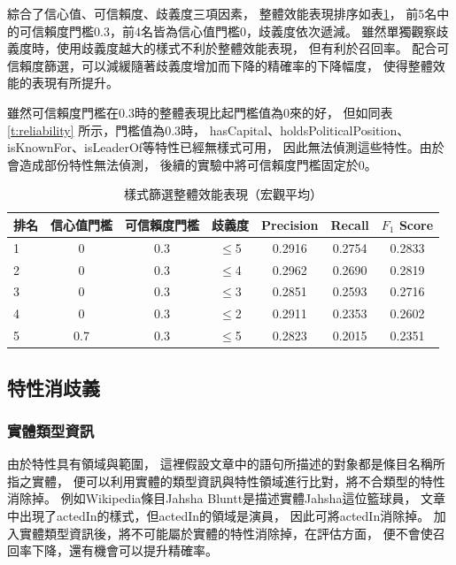 綜合了信心值、可信賴度、歧義度三項因素，
整體效能表現排序如表\ref{t:ptn-select-overall}，
前5名中的可信賴度門檻0.3，前4名皆為信心值門檻0，歧義度依次遞減。
雖然單獨觀察歧義度時，使用歧義度越大的樣式不利於整體效能表現，
但有利於召回率。
配合可信賴度篩選，可以減緩隨著歧義度增加而下降的精確率的下降幅度，
使得整體效能的表現有所提升。

雖然可信賴度門檻在0.3時的整體表現比起門檻值為0來的好，
但如同表\ref{t:reliability} 所示，門檻值為0.3時，
hasCapital、holdsPoliticalPosition、isKnownFor、isLeaderOf等特性已經無樣式可用，
因此無法偵測這些特性。由於會造成部份特性無法偵測，
後續的實驗中將可信賴度門檻固定於0。

\begin{table}[h]
    \caption{樣式篩選整體效能表現（宏觀平均）}
    \label{t:ptn-select-overall}
    \footnotesize
    \begin{center}
        \begin{tabular}{|l||c|c|c||c|c|c|}
            \hline
            排名 & 信心值門檻 & 可信賴度門檻 & 歧義度 & Precision & Recall & $F_1$ Score \\
            \hline
            1 & 0 & 0.3 & $\leq$5 & 0.2916 & 0.2754 & 0.2833 \\
            2 & 0 & 0.3 & $\leq$4 & 0.2962 & 0.2690 & 0.2819 \\
            3 & 0 & 0.3 & $\leq$3 & 0.2851 & 0.2593 & 0.2716 \\
            4 & 0 & 0.3 & $\leq$2 & 0.2911 & 0.2353 & 0.2602 \\
            5 & 0.7 & 0.3&$\leq$5 & 0.2823 & 0.2015 & 0.2351 \\
            \hline
        \end{tabular}
    \end{center}
\end{table}

\subsection{特性消歧義}
\subsubsection{實體類型資訊}
由於特性具有領域與範圍，
這裡假設文章中的語句所描述的對象都是條目名稱所指之實體，
便可以利用實體的類型資訊與特性領域進行比對，將不合類型的特性消除掉。
例如Wikipedia條目Jahsha Bluntt是描述實體Jahsha這位籃球員，
文章中出現了actedIn的樣式，但actedIn的領域是演員，
因此可將actedIn消除掉。
加入實體類型資訊後，將不可能屬於實體的特性消除掉，在評估方面，
便不會使召回率下降，還有機會可以提升精確率。

